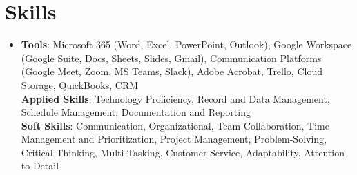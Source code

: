 \documentclass[letterpaper,11pt]{article}
\begin{document}
\section{Skills} %
\begin{itemize}[leftmargin=0.15in, label={}]
\item{
\textbf{Tools}{: Microsoft 365 (Word, Excel, PowerPoint, Outlook), Google Workspace (Google Suite, Docs, Sheets, Slides, Gmail), Communication Platforms (Google Meet, Zoom, MS Teams, Slack), Adobe Acrobat, Trello, Cloud Storage, QuickBooks, CRM} \\
\textbf{Applied Skills}{: Technology Proficiency, Record and Data Management, Schedule Management, Documentation and Reporting} \\
\textbf{Soft Skills}{: Communication, Organizational, Team Collaboration, Time Management and Prioritization, Project Management, Problem-Solving, Critical Thinking, Multi-Tasking, Customer Service, Adaptability, Attention to Detail}
} \\
\end{itemize}


\end{document}
